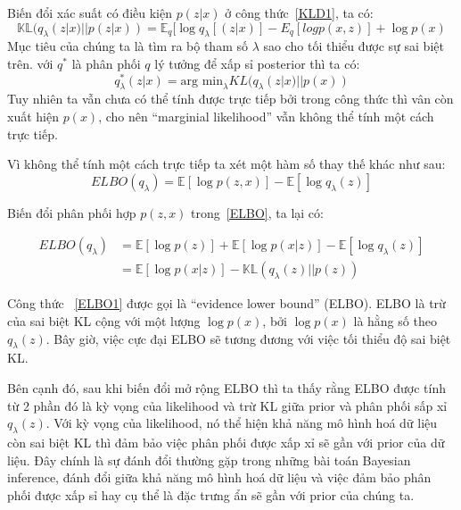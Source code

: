         Biến đổi xác suất có điều kiện $p(z|x)$ ở công thức~\ref{KLD1}, ta có:
        \begin{equation}
        \label{KLD2}
            \mathbb{KL}(q_\lambda(z|x) || p (z|x)) =   \mathbb{E}_q[\log q_\lambda[(z|x)] - E_q[log p(x,z)] + \log p(x)
        \end{equation}
        Mục tiêu của chúng ta là tìm ra bộ tham số $\lambda$  sao cho tối thiểu được sự sai biệt trên. với $q^*$ là phân phối $q$ lý tưởng để xấp sỉ posterior thì ta có:
        \begin{equation}
        \label{equal_qlambda}
            q^*_\lambda(z|x) = \text{arg min}_\lambda KL(q_\lambda(z|x)|| p(x))
        \end{equation}        
        Tuy nhiên ta vẫn chưa có thể tính được trực tiếp bởi trong công thức thì vân còn xuất hiện $p(x)$, cho nên ``marginial likelihood'' vẫn không thể tính một cách trực tiếp.

        Vì không thể tính một cách trực tiếp ta xét một hàm số thay thế khác như sau:
        \begin{equation}
        \label{ELBO}
            ELBO(q_\lambda) = \mathbb{E}[\log p(z,x)] - \mathbb{E}[\log q_\lambda(z)]
        \end{equation}

        Biến đổi phân phối hợp $p(z,x)$ trong~\ref{ELBO}, ta lại có: 

        \begin{equation} \label{ELBO1}
            \begin{split}
                ELBO(q_\lambda) & = \mathbb{E}[\log p(z)]+ \mathbb{E}[\log p(x|z)] - \mathbb{E}[\log q_\lambda(z)]\\
                                & = \mathbb{E}[\log p(x|z)] - \mathbb{KL}( q_\lambda(z)|| p(z))
            \end{split}
        \end{equation}

        Công thức ~\ref{ELBO1} được gọi là ``evidence lower bound'' (ELBO).
        ELBO là trừ của sai biệt KL cộng với một lượng $\log p(x)$, bởi $\log p(x)$ là hằng số theo $q_\lambda(z)$.
        Bây giờ, việc cực đại ELBO sẽ tương đương với việc tối thiểu độ sai biệt KL.
        
        \label{trade_off}
        Bên cạnh đó, sau khi biến đổi mở rộng ELBO thì ta thấy rằng ELBO được tính từ 2 phần đó là kỳ vọng của likelihood và trừ KL giữa prior và phân phối sấp xỉ $q_\lambda(z)$.
        Với kỳ vọng của likelihood, nó thể hiện khả năng mô hình hoá dữ liệu còn sai biệt KL thì đảm bảo việc phân phối được xấp xỉ sẽ gần với prior của  dữ liệu.
        Đây chính là sự đánh đổi thường gặp trong những bài toán Bayesian inference, đánh đổi giữa khả năng mô hình hoá dữ liệu và việc đảm bảo phân phối được xấp sỉ hay cụ thể là đặc trưng ẩn sẽ gần với prior của chúng ta.


